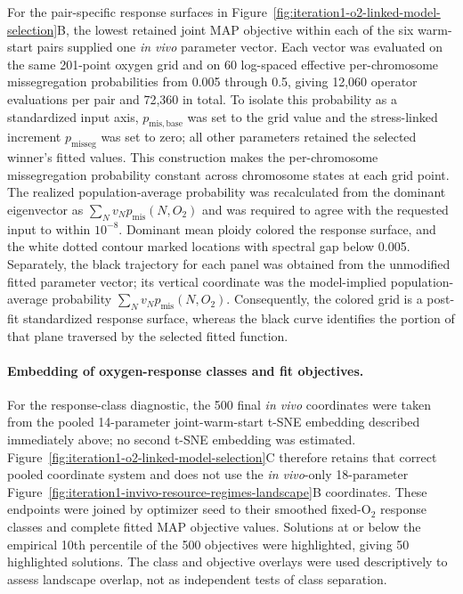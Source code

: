 \documentclass[11pt]{article}
\begin{document}
For the pair-specific response surfaces in Figure~\ref{fig:iteration1-o2-linked-model-selection}B, the lowest retained joint MAP objective within each of the six warm-start pairs supplied one \textit{in vivo} parameter vector. Each vector was evaluated on the same 201-point oxygen grid and on 60 log-spaced effective per-chromosome missegregation probabilities from 0.005 through 0.5, giving 12,060 operator evaluations per pair and 72,360 in total. To isolate this probability as a standardized input axis, \(p_{\mathrm{mis,base}}\) was set to the grid value and the stress-linked increment \(p_{\mathrm{misseg}}\) was set to zero; all other parameters retained the selected winner's fitted values. This construction makes the per-chromosome missegregation probability constant across chromosome states at each grid point. The realized population-average probability was recalculated from the dominant eigenvector as \(\sum_Nv_Np_{\mathrm{mis}}(N,O_2)\) and was required to agree with the requested input to within \(10^{-8}\). Dominant mean ploidy colored the response surface, and the white dotted contour marked locations with spectral gap below 0.005. Separately, the black trajectory for each panel was obtained from the unmodified fitted parameter vector; its vertical coordinate was the model-implied population-average probability \(\sum_Nv_Np_{\mathrm{mis}}(N,O_2)\). Consequently, the colored grid is a post-fit standardized response surface, whereas the black curve identifies the portion of that plane traversed by the selected fitted function.

\paragraph{Embedding of oxygen-response classes and fit objectives.}
For the response-class diagnostic, the 500 final \textit{in vivo} coordinates were taken from the pooled 14-parameter joint-warm-start t-SNE embedding described immediately above; no second t-SNE embedding was estimated. Figure~\ref{fig:iteration1-o2-linked-model-selection}C therefore retains that correct pooled coordinate system and does not use the \textit{in vivo}-only 18-parameter Figure~\ref{fig:iteration1-invivo-resource-regimes-landscape}B coordinates. These endpoints were joined by optimizer seed to their smoothed fixed-O$_2$ response classes and complete fitted MAP objective values. Solutions at or below the empirical 10th percentile of the 500 objectives were highlighted, giving 50 highlighted solutions. The class and objective overlays were used descriptively to assess landscape overlap, not as independent tests of class separation.
\end{document}
